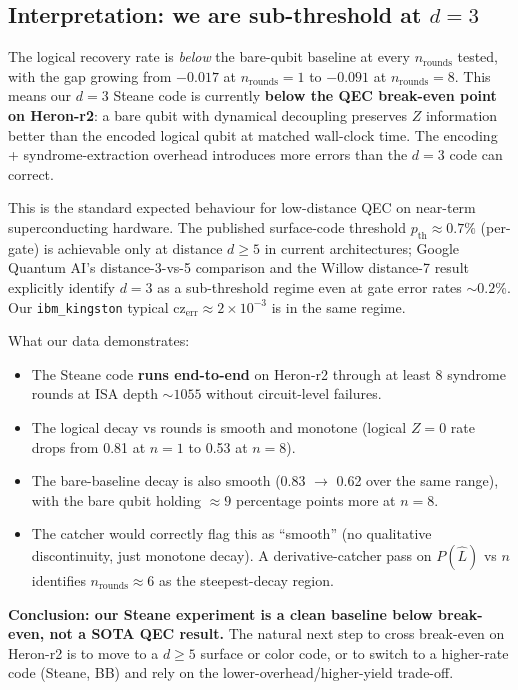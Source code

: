 \documentclass[11pt,letterpaper]{article}
\begin{document}
\subsection{Interpretation: we are sub-threshold at $d = 3$}

The logical recovery rate is \emph{below} the bare-qubit baseline at every $n_{\mathrm{rounds}}$ tested, with the gap growing from $-0.017$ at $n_{\mathrm{rounds}} = 1$ to $-0.091$ at $n_{\mathrm{rounds}} = 8$. This means our $d = 3$ Steane code is currently \textbf{below the QEC break-even point on Heron-r2}: a bare qubit with dynamical decoupling preserves $Z$ information better than the encoded logical qubit at matched wall-clock time. The encoding + syndrome-extraction overhead introduces more errors than the $d = 3$ code can correct.

This is the standard expected behaviour for low-distance QEC on near-term superconducting hardware. The published surface-code threshold $p_{\mathrm{th}} \approx 0.7\%$ (per-gate) is achievable only at distance $d \ge 5$ in current architectures; Google Quantum AI's distance-3-vs-5 comparison \cite{willow_precursor} and the Willow distance-7 result \cite{willow} explicitly identify $d = 3$ as a sub-threshold regime even at gate error rates $\sim 0.2$\%. Our \texttt{ibm\_kingston} typical $\mathrm{cz}_{\mathrm{err}} \approx 2 \times 10^{-3}$ is in the same regime.

What our data demonstrates:
\begin{itemize}[leftmargin=*,itemsep=0pt]
\item The Steane code \textbf{runs end-to-end} on Heron-r2 through at least 8 syndrome rounds at ISA depth $\sim 1055$ without circuit-level failures.
\item The logical decay vs rounds is smooth and monotone (logical $Z = 0$ rate drops from 0.81 at $n = 1$ to 0.53 at $n = 8$).
\item The bare-baseline decay is also smooth (0.83 $\to$ 0.62 over the same range), with the bare qubit holding $\approx 9$ percentage points more at $n = 8$.
\item The catcher would correctly flag this as ``smooth'' (no qualitative discontinuity, just monotone decay). A derivative-catcher pass on $P(\hat L)$ vs $n$ identifies $n_{\mathrm{rounds}} \approx 6$ as the steepest-decay region.
\end{itemize}

\textbf{Conclusion: our Steane experiment is a clean baseline below break-even, not a SOTA QEC result.} The natural next step to cross break-even on Heron-r2 is to move to a $d \ge 5$ surface or color code, or to switch to a higher-rate code (Steane, BB) and rely on the lower-overhead/higher-yield trade-off.
\end{document}

